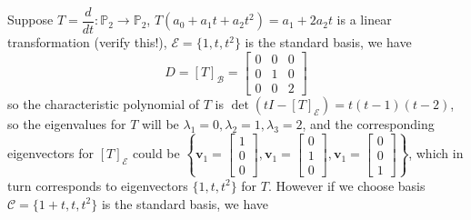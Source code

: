\documentclass{beamer}
\theoremstyle{definition}
\theoremstyle{remark}
\begin{document}
\begin{frame}[t]
\begin{example}
Suppose $T=\dfrac{d}{dt}:\mathbb P_2\to\mathbb P_2$, $T(a_0+a_1t+a_2t^2)=a_1+2a_2t$ is a linear transformation (verify this!), $\mathcal E=\{1,t,t^2\}$ is the standard basis, we have\pause
\[
D=[T]_{\mathcal B}=\begin{bmatrix}
0&0&0\\
0&1&0\\
0&0&2
\end{bmatrix}
\]
so the characteristic polynomial of $T$ is $\det(tI-[T]_{\mathcal E})=t(t-1)(t-2)$, so the eigenvalues for $T$ will be $\lambda_1=0,\lambda_2=1,\lambda_3=2$\pause, and the corresponding eigenvectors for $[T]_{\mathcal E}$ could be $\left\{\mathbf v_1=\begin{bmatrix}
1\\0\\0
\end{bmatrix},\mathbf v_1=\begin{bmatrix}
0\\1\\0
\end{bmatrix},\mathbf v_1=\begin{bmatrix}
0\\0\\1
\end{bmatrix}\right\}$, which in turn corresponds to eigenvectors $\{1,t,t^2\}$ for $T$. However if we choose basis $\mathcal C=\{1+t,t,t^2\}$ is the standard basis, we have
\end{example}
\end{frame}
\end{document}
